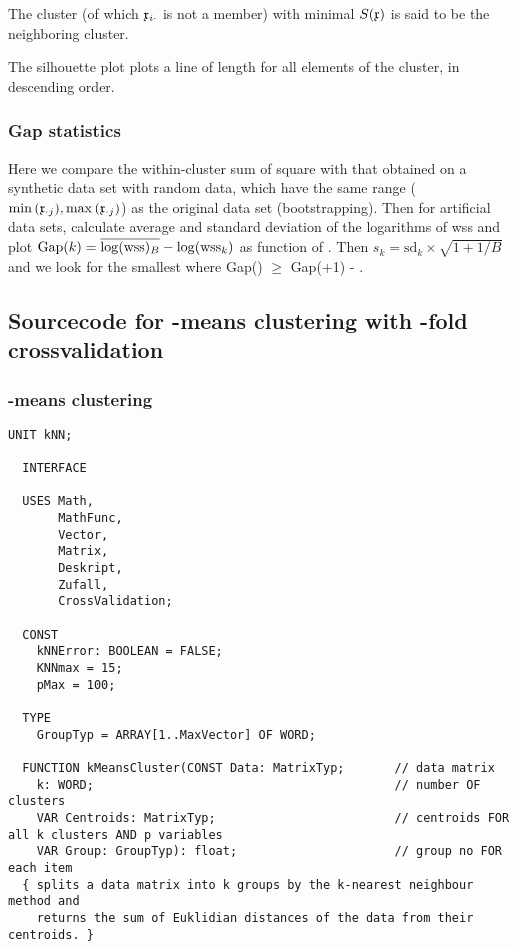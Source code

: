 \begin{refsection}
The cluster (of which \( \mathfrak{x}_{i\cdot} \) is not a member) with minimal \( S(\mathfrak{x}) \) is said to be the neighboring cluster.

The silhouette plot plots a line of length  for all elements of the cluster, in descending order.


\subsubsection{Gap statistics}

Here we compare the within-cluster sum of square with that obtained on a synthetic data set with random data, which have the same range (\(\min{(\ensuremath{\mathfrak{x}}_{\cdot j})}, \max{(\ensuremath{\mathfrak{x}}_{\cdot j})}\)) as the original data set (bootstrapping). Then for  artificial data sets, calculate average and standard deviation of the logarithms of wss and plot \( \mathrm{Gap}(k) = \overline{\log(\mathrm{wss})_B} - \log(\mathrm{wss}_k) \) as function of . Then \( s_k = \mathrm{sd}_k \times \sqrt{1 + 1/B} \) and we look for the smallest  where Gap() \(\geq\) Gap(+1) - .

\subsection{Sourcecode for -means clustering with -fold crossvalidation}

\subsubsection{-means clustering}

\begin{lstlisting}[caption=unit kNN: \skalar{k}-means clustering]
  UNIT kNN;

  INTERFACE

  USES Math,
       MathFunc,
       Vector,
       Matrix,
       Deskript,
       Zufall,
       CrossValidation;

  CONST
    kNNError: BOOLEAN = FALSE;
    KNNmax = 15;
    pMax = 100;

  TYPE
    GroupTyp = ARRAY[1..MaxVector] OF WORD;

  FUNCTION kMeansCluster(CONST Data: MatrixTyp;       // data matrix
    k: WORD;                                          // number OF clusters
    VAR Centroids: MatrixTyp;                         // centroids FOR all k clusters AND p variables
    VAR Group: GroupTyp): float;                      // group no FOR each item
  { splits a data matrix into k groups by the k-nearest neighbour method and
    returns the sum of Euklidian distances of the data from their centroids. }


\end{lstlisting}
\end{refsection}
